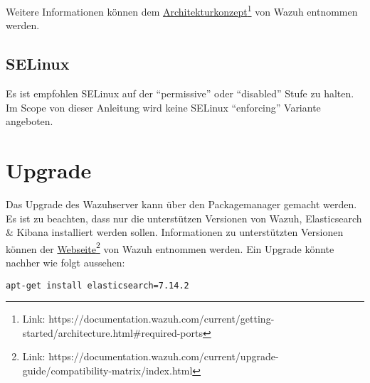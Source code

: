 Weitere Informationen können dem \href{https://documentation.wazuh.com/current/getting-started/architecture.html\#required-ports}{Architekturkonzept}\footnote{Link: https://documentation.wazuh.com/current/getting-started/architecture.html\#required-ports} von Wazuh entnommen werden.\\


\subsection{SELinux}
Es ist empfohlen SELinux auf der ``permissive'' oder ``disabled'' Stufe zu halten. Im Scope von dieser Anleitung wird keine SELinux ``enforcing'' Variante angeboten.

\section{Upgrade}
Das Upgrade des Wazuhserver kann über den Packagemanager gemacht werden.
Es ist zu beachten, dass nur die unterstützen Versionen von Wazuh, Elasticsearch \& Kibana installiert werden sollen.
Informationen zu unterstützten Versionen können der \href{https://documentation.wazuh.com/current/upgrade-guide/compatibility-matrix/index.html}{Webseite}\footnote{Link: https://documentation.wazuh.com/current/upgrade-guide/compatibility-matrix/index.html} von Wazuh entnommen werden. Ein Upgrade könnte nachher wie folgt aussehen:
\begin{lstlisting}
apt-get install elasticsearch=7.14.2
\end{lstlisting}


